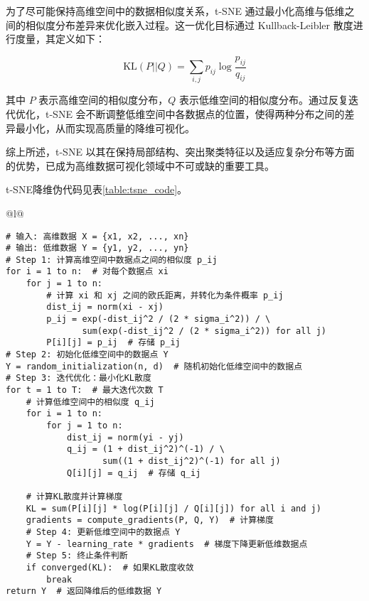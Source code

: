 \documentclass[master]{thesis-uestc}
\begin{document}
为了尽可能保持高维空间中的数据相似度关系，t-SNE 通过最小化高维与低维之间的相似度分布差异来优化嵌入过程。这一优化目标通过 Kullback-Leibler 散度进行度量，其定义如下：

\begin{equation}
\text{KL}(P || Q) = \sum_{i,j} p_{ij} \log \frac{p_{ij}}{q_{ij}}
\end{equation}

其中 \(P\) 表示高维空间的相似度分布，\(Q\) 表示低维空间的相似度分布。通过反复迭代优化，t-SNE 会不断调整低维空间中各数据点的位置，使得两种分布之间的差异最小化，从而实现高质量的降维可视化。

综上所述，t-SNE 以其在保持局部结构、突出聚类特征以及适应复杂分布等方面的优势，已成为高维数据可视化领域中不可或缺的重要工具。

t-SNE降维伪代码见表\ref{table:tsne_code}。
\begin{table}[h]
    \caption{{t-SNE算法伪代码}}
    { %
    \begin{tabular}{@{}l@{}} %
    \toprule
     \\
    \midrule
    \begin{lstlisting}[basicstyle=\fontspec{Times New Roman}, frame=none]
# 输入: 高维数据 X = {x1, x2, ..., xn}
# 输出: 低维数据 Y = {y1, y2, ..., yn}
# Step 1: 计算高维空间中数据点之间的相似度 p_ij
for i = 1 to n:  # 对每个数据点 xi
    for j = 1 to n:
        # 计算 xi 和 xj 之间的欧氏距离，并转化为条件概率 p_ij
        dist_ij = norm(xi - xj)
        p_ij = exp(-dist_ij^2 / (2 * sigma_i^2)) / \
               sum(exp(-dist_ij^2 / (2 * sigma_i^2)) for all j)
        P[i][j] = p_ij  # 存储 p_ij    
# Step 2: 初始化低维空间中的数据点 Y
Y = random_initialization(n, d)  # 随机初始化低维空间中的数据点
# Step 3: 迭代优化：最小化KL散度
for t = 1 to T:  # 最大迭代次数 T
    # 计算低维空间中的相似度 q_ij
    for i = 1 to n:
        for j = 1 to n:
            dist_ij = norm(yi - yj)
            q_ij = (1 + dist_ij^2)^(-1) / \
                   sum((1 + dist_ij^2)^(-1) for all j)
            Q[i][j] = q_ij  # 存储 q_ij

    # 计算KL散度并计算梯度
    KL = sum(P[i][j] * log(P[i][j] / Q[i][j]) for all i and j)
    gradients = compute_gradients(P, Q, Y)  # 计算梯度    
    # Step 4: 更新低维空间中的数据点 Y
    Y = Y - learning_rate * gradients  # 梯度下降更新低维数据点
    # Step 5: 终止条件判断
    if converged(KL):  # 如果KL散度收敛
        break
return Y  # 返回降维后的低维数据 Y
    \end{lstlisting} \\
    \bottomrule
    \end{tabular}
    }
    \label{table:tsne_code}
\end{table}
\FloatBarrier  %
\end{document}
